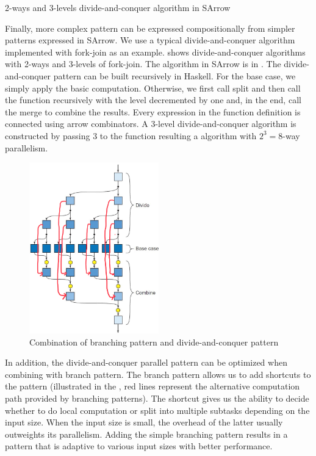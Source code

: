 \begin{listing}[ht]
    \inputminted{Haskell}{arrow/dq.hs}
    \caption{2-ways and 3-levels divide-and-conquer algorithm in SArrow}
    \label{SArrow:dq}
\end{listing}

Finally, more complex pattern can be expressed compositionally from simpler patterns expressed in SArrow. We use a typical divide-and-conquer algorithm implemented with fork-join as an example.  shows divide-and-conquer algorithms with 2-ways and 3-levels of fork-join. The algorithm in SArrow is in . The divide-and-conquer pattern can be built recursively in Haskell. For the base case, we simply apply the basic computation. Otherwise, we first call split and then call the function recursively with the level decremented by one and, in the end, call the merge to combine the results. Every expression in the function definition is connected using arrow combinators. A 3-level divide-and-conquer algorithm is constructed by passing 3 to the function resulting a algorithm with $2^3 = 8$-way parallelism.

\begin{figure}[ht]
    \centering
    \includegraphics[width=0.5\textwidth]{arrow/dq2.jpeg}
    \caption{Combination of branching pattern and divide-and-conquer pattern}
    \label{SArrow:fig:brdv}
\end{figure}
In addition, the divide-and-conquer parallel pattern can be optimized when combining with branch pattern. The branch pattern allows us to add shortcuts to the pattern (illustrated in the , red lines represent the alternative computation path provided by branching patterns). The shortcut gives us the ability to decide whether to do local computation or split  into multiple subtasks depending on the input size. When the input size is small, the overhead of the latter usually outweights its parallelism. Adding the simple branching pattern results in a pattern that is adaptive to various input sizes with better performance.

